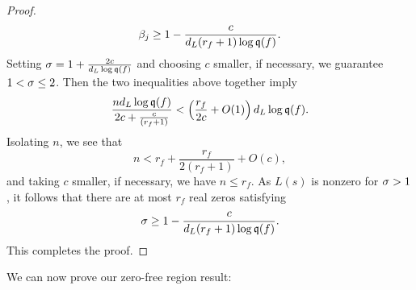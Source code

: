 \documentclass[12pt]{article}
\begin{document}
\begin{proof}
      \[
        \beta_{j} \ge 1-\frac{c}{d_{L}(r_{f}+1)\log{\mathfrak{q}(f)}}.
      \]
      Setting \(\sigma = 1+\frac{2c}{d_{L}\log{\mathfrak{q}(f)}}\) and choosing \(c\) smaller, if necessary, we guarantee \(1 < \sigma \le 2\). Then the two inequalities above together imply
      \[
        \frac{nd_{L}\log{\mathfrak{q}(f)}}{2c+\frac{c}{(r_{f}+1)}} < \left(\frac{r_{f}}{2c}+O(1)\right)d_{L}\log{\mathfrak{q}(f)}.
      \]
      Isolating \(n\), we see that
      \[
        n < r_{f}+\frac{r_{f}}{2(r_{f}+1)}+O(c),
      \]
      and taking \(c\) smaller, if necessary, we have \(n \le r_{f}\). As \(L(s)\) is nonzero for \(\sigma > 1\), it follows that there are at most \(r_{f}\) real zeros satisfying
      \[
        \sigma \ge 1-\frac{c}{d_{L}(r_{f}+1)\log{\mathfrak{q}(f)}}.
      \]
      This completes the proof.
    \end{proof}

    We can now prove our zero-free region result:
\end{document}
